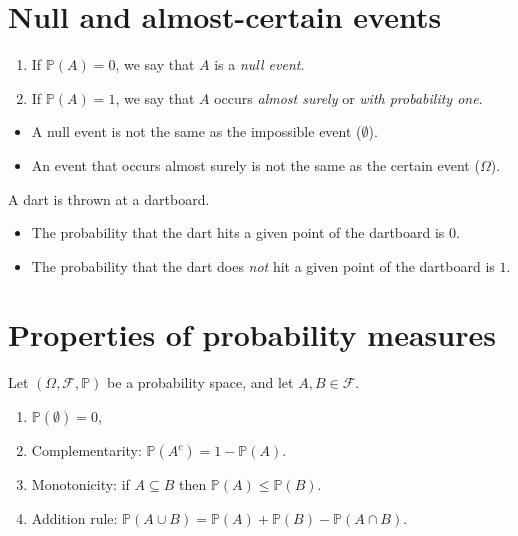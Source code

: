 \documentclass[lecture]{csm}
\newcommand{\prob}{\mathbb{P}}
\def\it{\item}
\def\bit{\begin{itemize}}
\def\eit{\end{itemize}}
\def\ben{\begin{enumerate}}
\def\een{\end{enumerate}}
\begin{document}

\newpage
\section{Null and almost-certain events}

\begin{definition}
\ben
\it If $\prob(A)=0$, we say that $A$ is a \emph{null event}.
\it If $\prob(A)=1$, we say that $A$ occurs \emph{almost surely} or \emph{with probability one}.
\een
\end{definition}

\begin{remark}
\bit
\it A null event is not the same as the impossible event ($\emptyset$). 
\it An event that occurs almost surely is not the same as the certain event ($\Omega$).
\eit
\end{remark}

\begin{example}
A dart is thrown at a dartboard.
\bit
\it The probability that the dart hits a given point of the dartboard is $0$.
\it The probability that the dart does \emph{not} hit a given point of the dartboard is $1$.
\eit
\end{example}

\newpage
\section{Properties of probability measures}

\begin{theorem}%
Let $(\Omega,\mathcal{F},\prob)$ be a probability space, and let $A,B\in\mathcal{F}$. 
\ben
\it $\prob(\emptyset) = 0$,
\it Complementarity: $\prob(A^c) = 1 - \prob(A)$.
\it Monotonicity: if $A\subseteq B$ then $\prob(A)\leq \prob(B)$.
\it Addition rule: $\prob(A\cup B) = \prob(A) + \prob(B) - \prob(A\cap B)$.
\een
\end{theorem}
\end{document}
